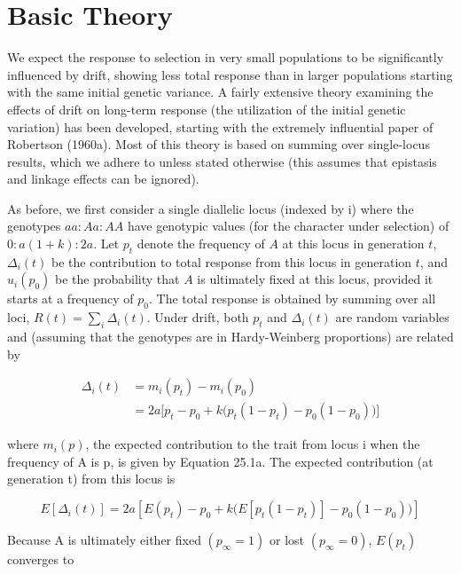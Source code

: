\documentclass{article}
\begin{document}
\section{Basic Theory}
We expect the response to selection in very small populations to be significantly influenced by drift, showing less total response than in larger populations starting with the same initial genetic variance. A fairly extensive theory examining the effects of drift on long-term response (the utilization of the initial genetic variation) has been developed, starting with the extremely influential paper of Robertson (1960a). Most of this theory is based on summing over single-locus results, which we adhere to unless stated otherwise (this assumes that epistasis and linkage effects can be ignored).

As before, we first consider a single diallelic locus (indexed by i) where the genotypes  $ aa:Aa:AA $ have genotypic values (for the character under selection) of  $ 0:a(1+k):2a $. Let  $ p_t $ denote the frequency of  $ A $ at this locus in generation  $ t $,  $ \Delta_i(t) $ be the contribution to total response from this locus in generation  $ t $, and  $ u_i(p_0) $ be the probability that  $ A $ is ultimately fixed at this locus, provided it starts at a frequency of  $ p_0 $. The total response is obtained by summing over all loci,  $ R(t) = \sum_i \Delta_i(t) $. Under drift, both  $ p_t $ and  $ \Delta_i(t) $ are random variables and (assuming that the genotypes are in Hardy-Weinberg proportions) are related by

\begin{equation}
\begin{aligned}\Delta_{i}(t)&=m_{i}(p_{t})-m_{i}(p_{0})\\&=2a\Bigg[p_{t}-p_{0}+k\Bigg(p_{t}(1-p_{t})-p_{0}(1-p_{0})\Bigg)\Bigg]\end{aligned}
\tag{26.10a}
\label{eq:26_10a}
\end{equation}

where  $ m_{i}(p) $, the expected contribution to the trait from locus i when the frequency of A is p, is given by Equation 25.1a. The expected contribution (at generation t) from this locus is

\begin{equation}
E[\Delta_{i}(t)]=2a\left[E(p_{t})-p_{0}+k\Biggl(E[p_{t}(1-p_{t})]-p_{0}(1-p_{0})\Biggr)\right]
\tag{26.10b}
\label{eq:26_10b}
\end{equation}

Because A is ultimately either fixed  $ (p_{\infty}=1) $ or lost  $ (p_{\infty}=0) $,  $ E(p_{t}) $ converges to
\end{document}
